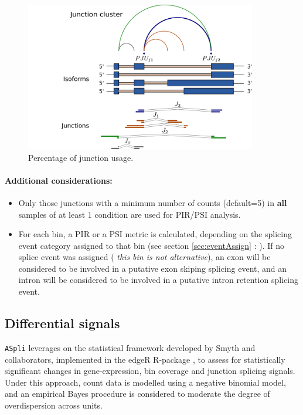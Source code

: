 \documentclass{article}
\newcommand{\secref}[1]{\ref{#1} : \nameref{#1}}
\begin{document}
\begin{figure}[ht!]
  \centering
  \includegraphics[width=0.9\textwidth]{images/clusters_ok.pdf}
  \caption{Percentage of junction usage.}
  \label{fig:jcluster}
\end{figure}


\paragraph{Additional considerations:}
\begin{itemize}

\item  Only those junctions with a minimum number of counts (default=5) in \textbf{all} samples of at least 1 condition are used for PIR/PSI analysis.

\item  For each bin, a PIR or a PSI  metric is calculated, depending on the splicing event category assigned to that bin (see section \secref{sec:eventAssign}).
If no splice event was assigned (\textit{ this bin is not alternative}), an exon will be considered to be involved in a putative exon skiping splicing event, and
an intron will be considered to be involved in a putative intron retention splicing event.

\end{itemize}


\subsection{Differential signals}\label{sec:difsignals}

\texttt{ASpli} leverages on the statistical framework developed by Smyth and collaborators, implemented in the edgeR R-package \cite{Robinson2010, McCarthy2012}, to assess for statistically significant changes in gene-expression, bin coverage and junction splicing signals. Under this approach, count data is modelled using a negative binomial model, and  an empirical Bayes procedure is considered to moderate the degree of overdispersion across units.
\end{document}
